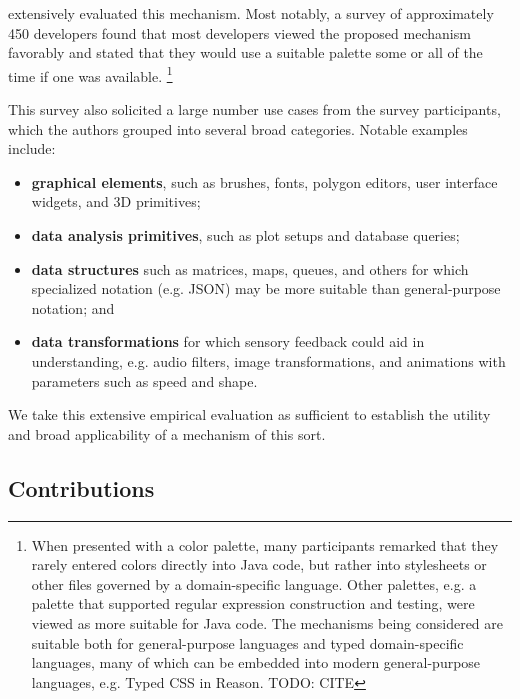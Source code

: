 \citet{Graphite} extensively evaluated this mechanism. 
Most notably, a survey of approximately 450 developers found that 
most developers viewed the proposed mechanism favorably and stated that they 
would use a suitable palette some or all of the time if one was available.%
\footnote{When presented with a color palette, 
many participants remarked that they rarely entered colors directly into Java code, 
but rather into stylesheets or other files governed by a domain-specific language. 
Other palettes, e.g. a palette
that supported regular expression construction and testing, were viewed as more 
suitable for Java code. 
The mechanisms being considered are suitable both for general-purpose languages
and typed domain-specific languages, many of which can be embedded into modern 
general-purpose languages, e.g. Typed CSS in Reason. TODO: CITE}

This survey also solicited a large number use cases from the survey participants, 
which the authors grouped into several broad categories. Notable examples include:
\begin{itemize}
  \item \textbf{graphical elements}, such as brushes, fonts, polygon editors, user interface widgets, and 3D primitives;
  \item \textbf{data analysis primitives}, such as plot setups and database queries; 
  \item \textbf{data structures} such as matrices, maps, queues, and others for which specialized notation (e.g. JSON) may be more suitable than general-purpose notation; and
  \item \textbf{data transformations} for which sensory feedback could aid in understanding, 
  e.g. audio filters, image transformations, and animations with parameters such as speed and shape.
\end{itemize}

We take this extensive empirical evaluation as sufficient to establish 
the utility and broad applicability of a mechanism of this sort. 

\subsection{Contributions}


